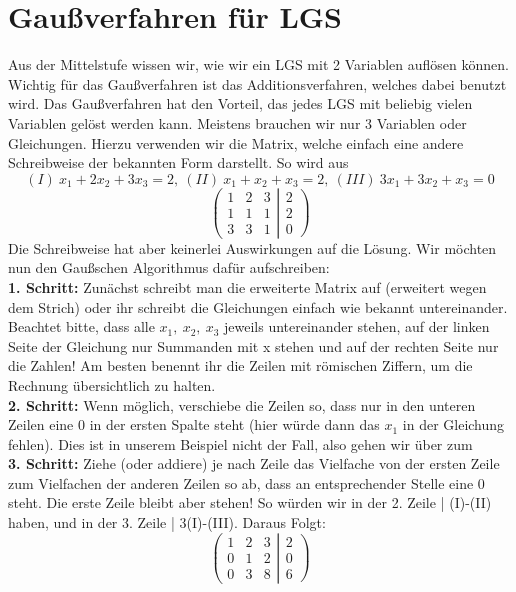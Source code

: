 \section{Gaußverfahren für LGS}
	Aus der Mittelstufe wissen wir, wie wir ein LGS mit 2 Variablen auflösen
	können. Wichtig für das Gaußverfahren ist das Additionsverfahren, welches dabei
	benutzt wird. Das Gaußverfahren hat den Vorteil, das jedes LGS mit beliebig
	vielen Variablen gelöst werden kann. Meistens brauchen wir nur 3 Variablen oder
	Gleichungen. Hierzu verwenden wir die Matrix, welche einfach eine andere
	Schreibweise der bekannten Form darstellt. So wird aus 
	\[(I)\ x_1+2x_2+3x_3=2,\
	(II)\ x_1+x_2+x_3=2,\ (III)\ 3x_1+3x_2+x_3=0\]
	\[
	\left(
	 \begin{matrix}
	  1 & 2 & 3\\
	  1 & 1 & 1\\
	  3 & 3 & 1
	 \end{matrix}
	 \left|
	  \begin{matrix}
	   2\\
	   2\\
	   0
	  \end{matrix}
	 \right)
	\right.
	\]
	Die Schreibweise hat aber keinerlei Auswirkungen auf die Lösung. Wir möchten
	nun den Gaußschen Algorithmus dafür aufschreiben:\\

	\textbf{1. Schritt:} Zunächst schreibt man die erweiterte Matrix auf (erweitert
	wegen dem Strich) oder ihr schreibt die Gleichungen einfach wie bekannt
	untereinander. Beachtet bitte, dass alle \(x_1,\ x_2,\ x_3\) jeweils
	untereinander stehen, auf der linken Seite der Gleichung nur Summanden mit x
	stehen und auf der rechten Seite nur die Zahlen! Am besten benennt ihr die
	Zeilen mit römischen Ziffern, um die Rechnung übersichtlich zu halten.\\

	\textbf{2. Schritt:} Wenn möglich, verschiebe die Zeilen so, dass nur in den
	unteren Zeilen eine 0 in der ersten Spalte steht (hier würde dann das \(x_1\)
	in der Gleichung fehlen). Dies ist in unserem Beispiel nicht der Fall, also
	gehen wir über zum\\

	\textbf{3. Schritt:} Ziehe (oder addiere) je nach Zeile das Vielfache von der
	ersten Zeile zum Vielfachen der anderen Zeilen so ab, dass an entsprechender
	Stelle eine 0 steht. Die erste Zeile bleibt aber stehen! So würden wir in der
	2. Zeile | (I)-(II) haben, und in der 3. Zeile | 3(I)-(III). Daraus Folgt:
	\[
	\left(
	 \begin{matrix}
	  1 & 2 & 3\\
	  0 & 1 & 2\\
	  0 & 3 & 8
	 \end{matrix}
	 \left|
	  \begin{matrix}
	   2\\
	   0\\
	   6
	  \end{matrix}
	 \right)
	\right.
	\]

